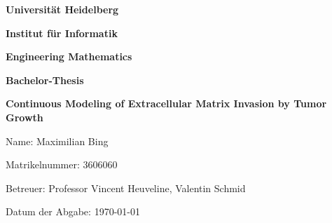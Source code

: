 \begin{titlepage}
    \begin{center}
	{\Huge\textbf{Universität Heidelberg}\par}
    {\Huge\textbf{Institut für Informatik} \par}
    {\Huge\textbf{Engineering Mathematics}\par}
	\vspace{3cm}
	{\Large\textbf{Bachelor-Thesis}\par}
	{\Huge\bfseries Continuous Modeling of Extracellular Matrix Invasion by Tumor Growth  \par}
    \end{center}
    \vspace{6cm}
	
    \raggedright
    {\Large Name: Maximilian Bing\par}
    {\Large Matrikelnummer: 3606060\par}
    {\Large Betreuer: Professor Vincent Heuveline, Valentin Schmid\par}
    {\Large Datum der Abgabe: \today\par}
\end{titlepage}